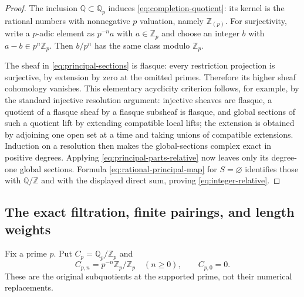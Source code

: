 \documentclass[11pt,a4paper]{article}
\theoremstyle{definition}\newtheorem{definition}[theorem]{Definition}
\begin{document}
\begin{proof}
The inclusion $\mathbb Q\subset\mathbb Q_p$ induces
\eqref{eq:completion-quotient}: its kernel is the rational numbers with
nonnegative $p$ valuation, namely $\mathbb Z_{(p)}$. For surjectivity,
write a $p$-adic element as $p^{-n}a$ with $a\in\mathbb Z_p$ and choose
an integer $b$ with $a-b\in p^n\mathbb Z_p$. Then $b/p^n$ has the same
class modulo $\mathbb Z_p$.

The sheaf in \eqref{eq:principal-sections} is flasque: every restriction
projection is surjective, by extension by zero at the omitted primes.
Therefore its higher sheaf cohomology vanishes. This elementary
acyclicity criterion follows, for example, by the standard injective
resolution argument: injective sheaves are flasque, a quotient of a
flasque sheaf by a flasque subsheaf is flasque, and global sections
of such a quotient lift by extending compatible local lifts; the
extension is obtained by adjoining one open set at a time and taking
unions of compatible extensions. Induction on a resolution then makes
the global-sections complex exact in positive degrees.
Applying \eqref{eq:principal-parts-relative} now leaves only its
degree-one global sections. Formula \eqref{eq:rational-principal-map}
for $S=\varnothing$ identifies those with $\mathbb Q/\mathbb Z$ and
with the displayed direct sum, proving \eqref{eq:integer-relative}.
\end{proof}

\subsection{The exact filtration, finite pairings, and length weights}

Fix a prime $p$. Put $C_p=\mathbb Q_p/\mathbb Z_p$ and
\[
 C_{p,n}=p^{-n}\mathbb Z_p/\mathbb Z_p\quad(n\ge0),
 \qquad C_{p,0}=0.
 \tag{RP27}\label{eq:prime-filtration}
\]
These are the original subquotients at the supported prime, not their
numerical replacements.
\end{document}

